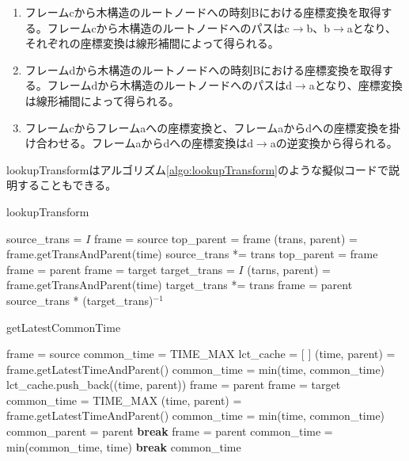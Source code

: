 \documentclass[a4paper]{jreport}	%
\begin{document}
\begin{enumerate}
	\item フレームcから木構造のルートノードへの時刻Bにおける座標変換を取得する。フレームcから木構造のルートノードへのパスはc$\rightarrow$b、b$\rightarrow$aとなり、それぞれの座標変換は線形補間によって得られる。
	\item フレームdから木構造のルートノードへの時刻Bにおける座標変換を取得する。フレームdから木構造のルートノードへのパスはd$\rightarrow$aとなり、座標変換は線形補間によって得られる。
	\item フレームcからフレームaへの座標変換と、フレームaからdへの座標変換を掛け合わせる。フレームaからdへの座標変換はd$\rightarrow$aの逆変換から得られる。
\end{enumerate}

lookupTransformはアルゴリズム\ref{algo:lookupTransform}のような擬似コードで説明することもできる。

\begin{algorithm}
\caption{lookupTransform} \label{algo:lookupTransform}
\begin{algorithmic}[1]
	 
	 
	\EndIf
	\State source\_trans = $I$ 
	\State frame = source
	\State top\_parent = frame
	\State (trans, parent) = frame.getTransAndParent(time) 
	\State source\_trans *= trans
	\State top\_parent = frame
	\State frame = parent
	\EndWhile
	\State frame = target
	\State target\_trans = $I$
	\State (tarns, parent) = frame.getTransAndParent(time)
	\State target\_trans *= trans
	\State frame = parent
	\EndWhile
	\State \Return source\_trans * (target\_trans)$^{-1}$
	\EndFunction
\end{algorithmic}
\end{algorithm}


\begin{algorithm}
\caption{getLatestCommonTime}
\begin{algorithmic}[1]
	 
	\State frame = source
	\State common\_time = TIME\_MAX
	\State lct\_cache = [ ] 
	\State (time, parent) = frame.getLatestTimeAndParent()
	\State common\_time = min(time, common\_time)
	\State lct\_cache.push\_back((time, parent))
	\State frame = parent
	\EndWhile
	\State frame = target
	\State common\_time = TIME\_MAX
	\State (time, parent) = frame.getLatestTimeAndParent()
	\State common\_time = min(time, common\_time)
	\State common\_parent = parent
	\State \textbf{break}
	\EndIf
	\State frame = parent
	\EndWhile
	\State common\_time = min(common\_time, time)
	\State \textbf{break}
	\EndIf
	\EndFor
	\State \Return common\_time
	\EndFunction
\end{algorithmic}
\end{algorithm}
\end{document}
